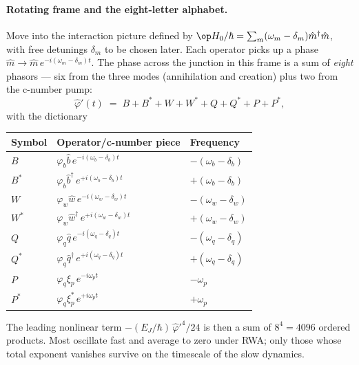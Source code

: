 \paragraph{Rotating frame and the eight-letter alphabet.}
Move into the interaction picture defined by
$\op H_0/\hbar = \sum_m(\omega_m-\delta_m)\hat m^\dagger\hat m$, with
free detunings $\delta_m$ to be chosen later. Each operator picks up
a phase $\hat m \to \hat m\,e^{-i(\omega_m-\delta_m)t}$. The
phase across the junction in this frame is a sum of
\emph{eight} phasors --- six from the three modes
(annihilation and creation) plus two from the c-number pump:
\begin{equation}
\label{eq:lescanne-phi-prime}
\hat\varphi'(t) \;=\; B+B^*+W+W^*+Q+Q^*+P+P^*,
\end{equation}
with the dictionary
\begin{center}
\renewcommand{\arraystretch}{1.18}
\begin{tabular}{lll}
\toprule
Symbol & Operator/c-number piece & Frequency \\
\midrule
$B$    & $\varphi_b\hat b\,e^{-i(\omega_b-\delta_b)t}$ & $-(\omega_b-\delta_b)$ \\
$B^*$  & $\varphi_b\hat b^\dagger\,e^{+i(\omega_b-\delta_b)t}$ & $+(\omega_b-\delta_b)$ \\
$W$    & $\varphi_w\hat w\,e^{-i(\omega_w-\delta_w)t}$ & $-(\omega_w-\delta_w)$ \\
$W^*$  & $\varphi_w\hat w^\dagger\,e^{+i(\omega_w-\delta_w)t}$ & $+(\omega_w-\delta_w)$ \\
$Q$    & $\varphi_q\hat q\,e^{-i(\omega_q-\delta_q)t}$ & $-(\omega_q-\delta_q)$ \\
$Q^*$  & $\varphi_q\hat q^\dagger\,e^{+i(\omega_q-\delta_q)t}$ & $+(\omega_q-\delta_q)$ \\
$P$    & $\varphi_q\xi_p\,e^{-i\omega_p t}$ & $-\omega_p$ \\
$P^*$  & $\varphi_q\xi_p^*\,e^{+i\omega_p t}$ & $+\omega_p$ \\
\bottomrule
\end{tabular}
\end{center}
The leading nonlinear term $-(E_J/\hbar)\,\hat\varphi'^4/24$ is then a
sum of $8^4=4096$ ordered products. Most oscillate fast and average
to zero under RWA; only those whose total exponent vanishes survive
on the timescale of the slow dynamics.

